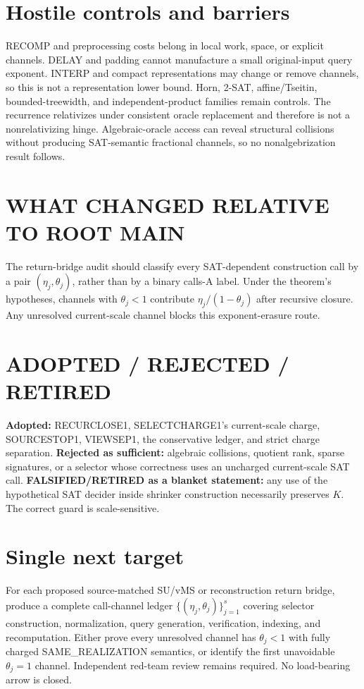 \documentclass[11pt]{article}
\begin{document}
\section*{Hostile controls and barriers}
RECOMP and preprocessing costs belong in local work, space, or explicit channels. DELAY and padding cannot manufacture a small original-input query exponent. INTERP and compact representations may change or remove channels, so this is not a representation lower bound. Horn, 2-SAT, affine/Tseitin, bounded-treewidth, and independent-product families remain controls. The recurrence relativizes under consistent oracle replacement and therefore is not a nonrelativizing hinge. Algebraic-oracle access can reveal structural collisions without producing SAT-semantic fractional channels, so no nonalgebrization result follows.

\section*{WHAT CHANGED RELATIVE TO ROOT MAIN}
The return-bridge audit should classify every SAT-dependent construction call by a pair \((\eta_j,\theta_j)\), rather than by a binary calls-A label. Under the theorem's hypotheses, channels with \(\theta_j<1\) contribute \(\eta_j/(1-\theta_j)\) after recursive closure. Any unresolved current-scale channel blocks this exponent-erasure route.

\section*{ADOPTED / REJECTED / RETIRED}
\textbf{Adopted:} RECURCLOSE1, SELECTCHARGE1's current-scale charge, SOURCESTOP1, VIEWSEP1, the conservative ledger, and strict charge separation.
\textbf{Rejected as sufficient:} algebraic collisions, quotient rank, sparse signatures, or a selector whose correctness uses an uncharged current-scale SAT call.
\textbf{FALSIFIED/RETIRED as a blanket statement:} any use of the hypothetical SAT decider inside shrinker construction necessarily preserves \(K\). The correct guard is scale-sensitive.

\section*{Single next target}
For each proposed source-matched SU/vMS or reconstruction return bridge, produce a complete call-channel ledger \(\{(\eta_j,\theta_j)\}_{j=1}^s\) covering selector construction, normalization, query generation, verification, indexing, and recomputation. Either prove every unresolved channel has \(\theta_j<1\) with fully charged SAME\_REALIZATION semantics, or identify the first unavoidable \(\theta_j=1\) channel. Independent red-team review remains required. No load-bearing arrow is closed.
\end{document}
